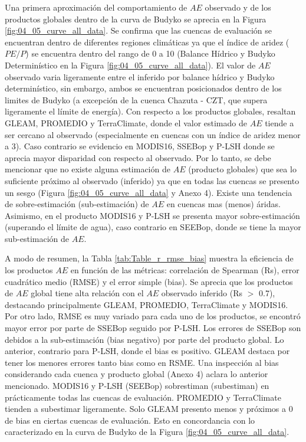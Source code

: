 \documentclass[12pt]{article}
\begin{document}
Una primera aproximación del comportamiento de $AE$ observado y de los productos globales dentro de la curva de Budyko se aprecia en la Figura \ref{fig:04_05_curve_all_data}. Se confirma que las cuencas de evaluación se encuentran dentro de diferentes regiones climáticas ya que el índice de aridez ($PE/P$) se encuentra dentro del rango de 0 a 10 (Balance Hídrico y Budyko Determinístico en la Figura \ref{fig:04_05_curve_all_data}). El valor de $AE$ observado varia ligeramente entre el inferido por balance hídrico y Budyko determinístico, sin embargo, ambos se encuentran posicionados dentro de los limites de Budyko (a excepción de la cuenca Chazuta - CZT, que supera ligeramente el límite de energía). Con respecto a los productos globales, resaltan GLEAM, PROMEDIO y TerraClimate, donde el valor estimado de $AE$ tiende a ser cercano al observado (especialmente en cuencas con un índice de aridez menor a 3). Caso contrario se evidencio en MODIS16, SSEBop y P-LSH donde se aprecia mayor disparidad con respecto al observado. Por lo tanto, se debe mencionar que no existe alguna estimación de $AE$ (producto globales) que sea lo suficiente próximo al observado (inferido) ya que en todas las cuencas se presento un sesgo (Figura \ref{fig:04_05_curve_all_data} y Anexo 4). Existe una tendencia de sobre-estimación (sub-estimación) de $AE$ en cuencas mas (menos) áridas. Asimismo, en el producto MODIS16 y P-LSH se presenta mayor sobre-estimación (superando el límite de agua), caso contrario en SEEBop, donde se tiene la mayor sub-estimación de $AE$.

A modo de resumen, la Tabla \ref{tab:Table_r_rmse_bias} muestra la eficiencia de los productos $AE$ en función de las métricas: correlación de Spearman (Rs), error cuadrático medio (RMSE) y el error simple (bias). Se aprecia que los productos de $AE$ global tiene alta relación con el $AE$ observado inferido (Rs $>$ 0.7), destacando principalmente GLEAM, PROMEDIO, TerraClimate y MODIS16. Por otro lado, RMSE es muy variado para cada uno de los productos, se encontró mayor error por parte de SSEBop seguido por P-LSH. Los errores de SSEBop son debidos a la sub-estimación (bias negativo) por parte del producto global. Lo anterior, contrario para P-LSH, donde el bias es positivo. GLEAM destaca por tener los menores errores tanto bias como en RSME. Una inspección al bias considerando cada cuenca y producto global (Anexo 4) aclara lo anterior mencionado. MODIS16 y P-LSH (SEEBop) sobrestiman (subestiman) en prácticamente todas las cuencas de evaluación. PROMEDIO y TerraClimate tienden a subestimar ligeramente. Solo GLEAM presento menos y próximos a 0 de bias en ciertas cuencas de evaluación. Esto en concordancia con lo caracterizado en la curva de Budyko de la Figura \ref{fig:04_05_curve_all_data}.
\end{document}
